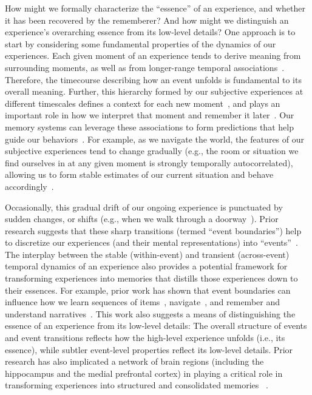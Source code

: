 \documentclass[10pt]{article}
\begin{document}
How might we formally characterize the ``essence'' of an experience, and whether it has been recovered by the rememberer?  And how might we distinguish an experience's overarching essence from its low-level details?  One approach is to start by considering some fundamental properties of the dynamics of our experiences.  Each given moment of an experience tends to derive meaning from surrounding moments, as well as from longer-range temporal associations~\citep{LernEtal11, Mann19, Mann20}.  Therefore, the timecourse describing how an event unfolds is fundamental to its overall meaning.  Further, this hierarchy formed by our subjective experiences at different timescales defines a context for each new moment~\citep{HowaKaha02a, HowaEtal14}, and plays an important role in how we interpret that moment and remember it later~\citep{MannEtal15, Mann20}.  Our memory systems can leverage these associations to form predictions that help guide our behaviors~\citep{RangRitc12}.  For example, as we navigate the world, the features of our subjective experiences tend to change gradually (e.g., the room or situation we find ourselves in at any given moment is strongly temporally autocorrelated), allowing us to form stable estimates of our current situation and behave accordingly~\citep{ZackEtal07, ZwaaRadv98}.

Occasionally, this gradual drift of our ongoing experience is punctuated by sudden changes, or shifts (e.g., when we walk through a doorway~\citep{RadvZack17}).  Prior research suggests that these sharp transitions (termed ``event boundaries'') help to discretize our experiences (and their mental representations) into ``events''~\citep{RadvZack17, BrunEtal18, HeusEtal18b, ClewDava17, EzzyDava11, DuBrDava13}.  The interplay between the stable (within-event) and transient (across-event) temporal dynamics of an experience also provides a potential framework for transforming experiences into memories that distills those experiences down to their essences.  For example, prior work has shown that event boundaries can influence how we learn sequences of items~\citep{HeusEtal18b, DuBrDava13}, navigate~\citep{BrunEtal18}, and remember and understand narratives~\citep{ZwaaRadv98, EzzyDava11}.  This work also suggests a means of distinguishing the essence of an experience from its low-level details:  The overall structure of events and event transitions reflects how the high-level experience unfolds (i.e., its essence), while subtler event-level properties reflect its low-level details.  Prior research has also implicated a network of brain regions (including the hippocampus and the medial prefrontal cortex) in playing a critical role in transforming experiences into structured and consolidated memories ~\citep{TompDava17}.
\end{document}
